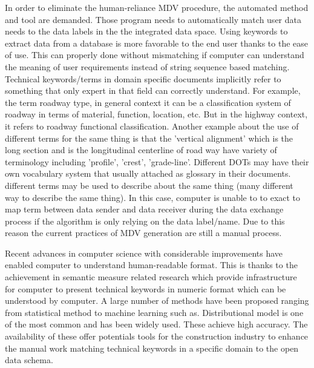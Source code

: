\documentclass[Journal, InsideFigs, DoubleSpace]{ascelike} %
\begin{document}
\par
In order to eliminate the human-reliance MDV procedure, the automated method and tool are demanded. Those program needs to automatically match user data needs to the data labels in the the integrated data space. Using keywords to extract data from a database is more favorable to the end user thanks to the ease of use. This can properly done without mismatching if computer can understand the meaning of user requirements instead of string sequence based matching. Technical keywords/terms in domain specific documents implicitly refer to something that only expert in that field can correctly understand. For example, the term roadway type, in general context it can be a classification system of roadway in terms of material, function, location, etc. But in the highway context, it refers to roadway functional classification. Another example about the use of different terms for the same thing is that the 'vertical alignment' which is the long section and is the longitudinal centerline of road way have variety of terminology including 'profile', 'crest', 'grade-line'. Different DOTs may have their own vocabulary system that usually attached as glossary in their documents. different terms may be used to describe about the same thing (many different way to describe the same thing). In this case, computer is unable to to exact to map term between data sender and data receiver during the data exchange process if the algorithm is only relying on the data label/name.  Due to this reason the current practices of MDV generation are still a manual process.
\par
Recent advances in computer science with considerable improvements have enabled computer to understand human-readable format. This is thanks to the achievement in semantic measure related research which provide infrastructure for computer to present technical keywords in numeric format which can be understood by computer. A large number of methods have been proposed ranging from statistical method to machine learning such as. Distributional model is one of the most common and has been widely used. These achieve high accuracy. The availability of these offer potentials tools for the construction industry to enhance the manual work matching technical keywords in a specific domain to the open data schema. 
\par
\end{document}
